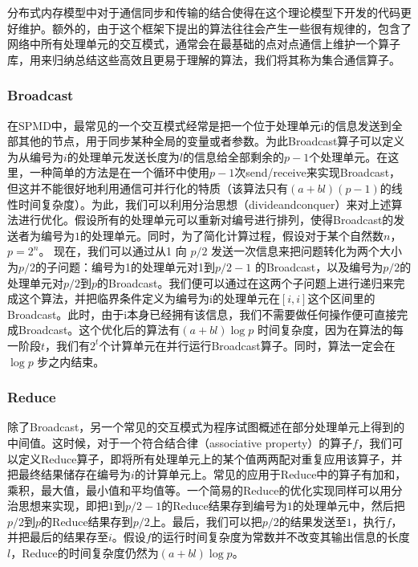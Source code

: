 \documentclass[letterpaper,10pt,english]{sphinxmanual}
\begin{document}
\sphinxAtStartPar
分布式内存模型中对于通信同步和传输的结合使得在这个理论模型下开发的代码更好维护。额外的，由于这个框架下提出的算法往往会产生一些很有规律的，包含了网络中所有处理单元的交互模式，通常会在最基础的点对点通信上维护一个算子库，用来归纳总结这些高效且更易于理解的算法，我们将其称为集合通信算子。


\subsubsection{Broadcast}
\label{\detokenize{chapter_distributed_training/collective:broadcast}}
\sphinxAtStartPar
在SPMD中，最常见的一个交互模式经常是把一个位于处理单元i的信息发送到全部其他的节点，用于同步某种全局的变量或者参数。为此Broadcast算子可以定义为从编号为\(i\)的处理单元发送长度为\(l\)的信息给全部剩余的\(p-1\)个处理单元。在这里，一种简单的方法是在一个循环中使用\(p-1\)次send/receive来实现Broadcast，但这并不能很好地利用通信可并行化的特质（该算法只有\((a+bl)(p-1)\)的线性时间复杂度）。为此，我们可以利用分治思想（divide\sphinxhyphen{}and\sphinxhyphen{}conquer）来对上述算法进行优化。假设所有的处理单元可以重新对编号进行排列，使得Broadcast的发送者为编号为\(1\)的处理单元。同时，为了简化计算过程，假设对于某个自然数\(n\)，\(p = 2^n\)。
现在，我们可以通过从1 向 \(p/2\)
发送一次信息来把问题转化为两个大小为\(p/2\)的子问题：编号为1的处理单元对1到\(p/2-1\)
的Broadcast，以及编号为\(p/2\)的处理单元对\(p/2\)到\(p\)的Broadcast。我们便可以通过在这两个子问题上进行递归来完成这个算法，并把临界条件定义为编号为i的处理单元在\([i,i]\)这个区间里的Broadcast。此时，由于i本身已经拥有该信息，我们不需要做任何操作便可直接完成Broadcast。这个优化后的算法有\((a+bl)\log p\)
时间复杂度，因为在算法的每一阶段\(t\)，我们有\(2^t\)个计算单元在并行运行Broadcast算子。同时，算法一定会在\(\log p\)
步之内结束。


\subsubsection{Reduce}
\label{\detokenize{chapter_distributed_training/collective:reduce}}
\sphinxAtStartPar
除了Broadcast，另一个常见的交互模式为程序试图概述在部分处理单元上得到的中间值。这时候，对于一个符合结合律（associative
property）的算子\(f\)，我们可以定义Reduce算子，即将所有处理单元上的某个值两两配对重复应用该算子，并把最终结果储存在编号为\(i\)的计算单元上。常见的应用于Reduce中的算子有加和，乘积，最大值，最小值和平均值等。一个简易的Reduce的优化实现同样可以用分治思想来实现，即把\(1\)到\(p/2-1\)的Reduce结果存到编号为\(1\)的处理单元中，然后把\(p/2\)到\(p\)的Reduce结果存到\(p/2\)上。最后，我们可以把\(p/2\)的结果发送至\(1\)，执行\(f\)，并把最后的结果存至\(i\)。假设\(f\)的运行时间复杂度为常数并不改变其输出信息的长度\(l\)，Reduce的时间复杂度仍然为\((a+bl)\log p\)。
\end{document}
